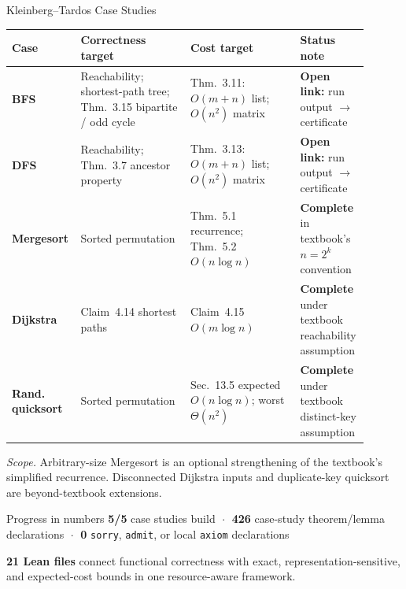 
\begin{frame}[t]{Kleinberg--Tardos Case Studies}
\vspace{0.15em}
\scriptsize
\renewcommand{\arraystretch}{1.35}
\setlength{\tabcolsep}{4pt}

\begin{tabular}{p{0.14\linewidth}p{0.30\linewidth}p{0.30\linewidth}p{0.16\linewidth}}
\toprule
\textbf{Case} & \textbf{Correctness target} & \textbf{Cost target} & \textbf{Status note} \\
\midrule

\rowcolor{uclablue!5}
\textbf{BFS}
& Reachability; shortest-path tree; Thm.~3.15 bipartite / odd cycle
& Thm.~3.11: \(O(m+n)\) list; \(O(n^2)\) matrix
& \textbf{Open link:} run output \(\to\) certificate \\

\rowcolor{leangreen!6}
\textbf{DFS}
& Reachability; Thm.~3.7 ancestor property
& Thm.~3.13: \(O(m+n)\) list; \(O(n^2)\) matrix
& \textbf{Open link:} run output \(\to\) certificate \\

\rowcolor{reviewgold!10}
\textbf{Mergesort}
& Sorted permutation
& Thm.~5.1 recurrence; Thm.~5.2 \(O(n\log n)\)
& \textbf{Complete} in textbook's \(n=2^k\) convention \\

\rowcolor{uclablue!5}
\textbf{Dijkstra}
& Claim~4.14 shortest paths
& Claim~4.15 \(O(m\log n)\)
& \textbf{Complete} under textbook reachability assumption \\

\rowcolor{leangreen!6}
\textbf{Rand. quicksort}
& Sorted permutation
& Sec.~13.5 expected \(O(n\log n)\); worst \(\Theta(n^2)\)
& \textbf{Complete} under textbook distinct-key assumption \\

\bottomrule
\end{tabular}

\vspace{0.35em}
{\tiny
\textit{Scope.} Arbitrary-size Mergesort is an optional strengthening of the textbook's
simplified recurrence. Disconnected Dijkstra inputs and duplicate-key quicksort are
beyond-textbook extensions.
}

\vspace{0.45em}

\begin{block}{Progress in numbers}
\centering
\small
\textbf{5/5} case studies build
\(\;\boldsymbol{\cdot}\;\)
\textbf{426} case-study theorem/lemma declarations
\(\;\boldsymbol{\cdot}\;\)
\textbf{0} \texttt{sorry}, \texttt{admit}, or local \texttt{axiom} declarations

\vspace{0.2em}
\scriptsize
\textbf{21 Lean files} connect functional correctness with exact, representation-sensitive,
and expected-cost bounds in one resource-aware framework.
\end{block}
\end{frame}
